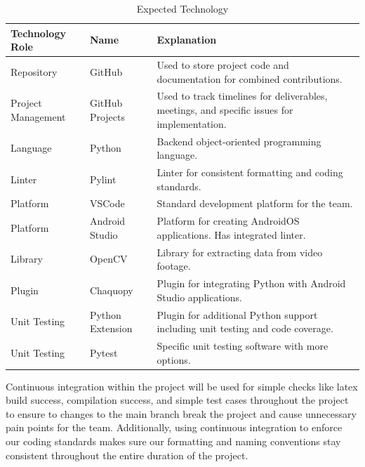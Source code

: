 \documentclass{article}
\begin{document}
\begin{table}[H]
\caption{Expected Technology} \label{Projected Technologies}
\begin{tabular}{ll|m{5cm}}
\textbf{Technology Role} & \textbf{Name}    & \textbf{Explanation}                                                                        \\ \hline
Repository               & GitHub           & Used to store project code and documentation for combined contributions.                    \\ \hline
Project Management       & GitHub Projects  & Used to track timelines for deliverables, meetings, and specific issues for implementation. \\ \hline
Language                 & Python           & Backend object-oriented programming language.                                               \\ \hline
Linter                   & Pylint           & Linter for consistent formatting and coding standards.                                      \\ \hline
Platform                 & VSCode           & Standard development platform for the team.                                                 \\ \hline
Platform                 & Android Studio   & Platform for creating AndroidOS applications. Has integrated linter.                        \\ \hline
Library                  & OpenCV           & Library for extracting data from video footage.                                             \\ \hline
Plugin                   & Chaquopy         & Plugin for integrating Python with Android Studio applications.                             \\ \hline
Unit Testing             & Python Extension & Plugin for additional Python support including unit testing and code coverage.              \\ \hline
Unit Testing             & Pytest           & Specific unit testing software with more options.
\end{tabular}
\end{table}

Continuous integration within the project will be used for simple checks like latex build success, compilation success, and simple test cases throughout the project to ensure to changes to the main branch break the project and cause unnecessary pain points for the team. Additionally, using continuous integration to enforce our coding standards makes sure our formatting and naming conventions stay consistent throughout the entire duration of the project.
\end{document}
